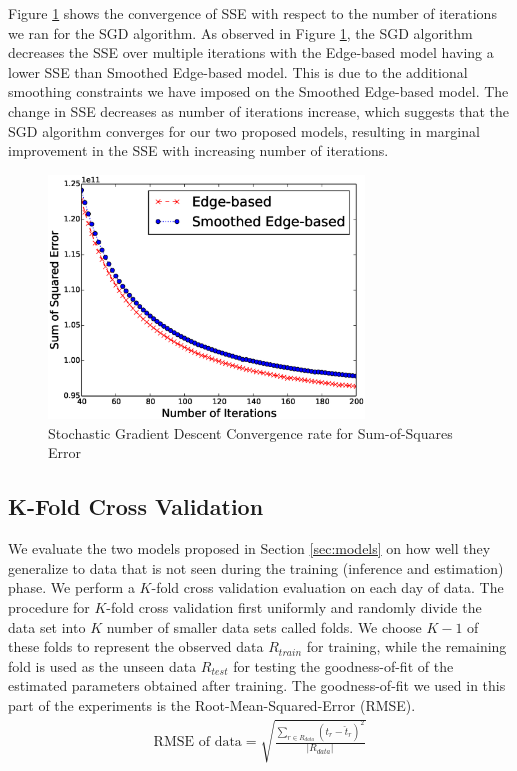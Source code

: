 \documentclass[conference]{IEEEtran.1.8}
\begin{document}
Figure \ref{fig:convergence} shows the convergence of SSE with respect to the number of iterations we ran for the SGD algorithm. As observed in Figure \ref{fig:convergence}, the SGD algorithm decreases the SSE over multiple iterations with the Edge-based model having a lower SSE than Smoothed Edge-based model. This is due to the additional smoothing constraints we have imposed on the Smoothed Edge-based model. The change in SSE decreases as number of iterations increase, which suggests that the SGD algorithm converges for our two proposed models, resulting in marginal improvement in the SSE with increasing number of iterations.
\begin{figure}[htb]
	\centering
	\includegraphics[width=3.3in]{convergence}
	\caption{Stochastic Gradient Descent Convergence rate for Sum-of-Squares Error}
	\label{fig:convergence}
\end{figure}

\subsection{K-Fold Cross Validation}

We evaluate the two models proposed in Section \ref{sec:models} on how well they generalize to data that is not seen during the training (inference and estimation) phase. We perform a $K$-fold cross validation evaluation on each day of data. The procedure for $K$-fold cross validation first uniformly and randomly divide the data set into $K$ number of smaller data sets called folds. We choose $K-1$ of these folds to represent the observed data $R_{train}$ for training, while the remaining fold is used as the unseen data $R_{test}$ for testing the goodness-of-fit of the estimated parameters obtained after training. The goodness-of-fit we used in this part of the experiments is the Root-Mean-Squared-Error (RMSE).
\begin{align*}
	\text{RMSE of data} = \sqrt{\frac{\sum_{r \in R_{data}} (t_r - \hat{t}_r)^2}{|R_{data}|}}
\end{align*}
\end{document}
